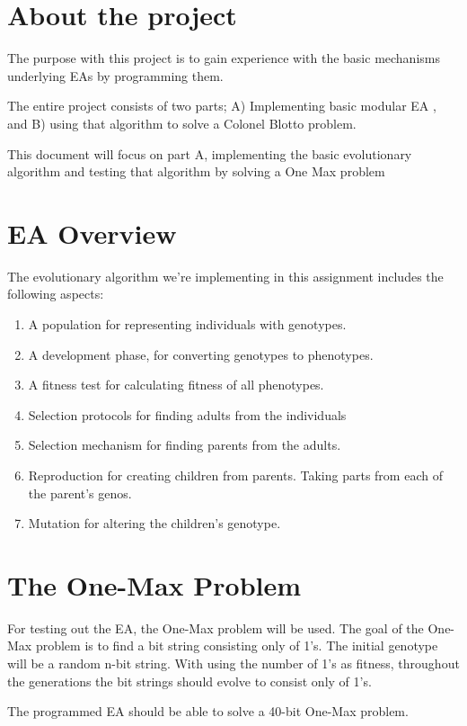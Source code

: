 \section{About the project}
The purpose with this project is to gain experience with the basic mechanisms underlying EAs
by programming them.

The entire project consists of two parts; A) Implementing basic modular EA , and B) using that 
algorithm to solve a Colonel Blotto problem.  

This document will focus on part A, implementing the basic evolutionary algorithm and testing
that algorithm by solving a One Max problem

\section{EA Overview}
The evolutionary algorithm we're implementing in this assignment includes the following aspects:

\begin{enumerate}

	\item A population for representing individuals with genotypes.
	
	\item A development phase, for converting genotypes to phenotypes.
	
	\item A fitness test for calculating fitness of all phenotypes.
	
	\item Selection protocols for finding adults from the individuals
	
	\item Selection mechanism for finding parents from the adults. 
	
	\item Reproduction for creating children from parents. Taking parts from each of the parent's genos. 
	
	\item Mutation for altering the children's genotype. 

\end{enumerate}


\section{The One-Max Problem}

For testing out the EA, the One-Max problem will be used. The goal of the One-Max problem is to find a 
bit string consisting only of 1's. The initial genotype will be a random n-bit string. With using the number
of 1's as fitness, throughout the generations the bit strings should evolve to consist only of 1's. 

The programmed EA should be able to solve a 40-bit One-Max problem. 

